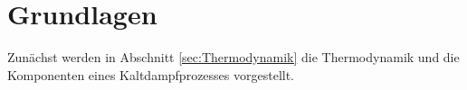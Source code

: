 \chapter{Grundlagen}
\label{cha:Grundlagen}

Zunächst werden in Abschnitt \ref{sec:Thermodynamik} die Thermodynamik und die Komponenten eines Kaltdampfprozesses vorgestellt. 










